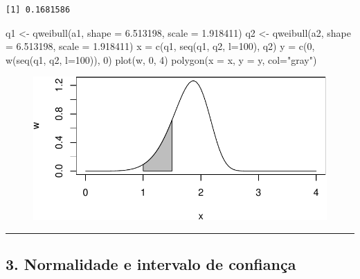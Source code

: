 \documentclass[
  letterpaper,
  DIV=11,
  numbers=noendperiod]{scrartcl}
\newenvironment{Shaded}{\begin{snugshade}}{\end{snugshade}}
\newcommand{\AttributeTok}[1]{\textcolor[rgb]{0.40,0.45,0.13}{#1}}
\newcommand{\DecValTok}[1]{\textcolor[rgb]{0.68,0.00,0.00}{#1}}
\newcommand{\FloatTok}[1]{\textcolor[rgb]{0.68,0.00,0.00}{#1}}
\newcommand{\FunctionTok}[1]{\textcolor[rgb]{0.28,0.35,0.67}{#1}}
\newcommand{\NormalTok}[1]{\textcolor[rgb]{0.00,0.23,0.31}{#1}}
\newcommand{\OtherTok}[1]{\textcolor[rgb]{0.00,0.23,0.31}{#1}}
\newcommand{\StringTok}[1]{\textcolor[rgb]{0.13,0.47,0.30}{#1}}
\begin{document}
\begin{verbatim}
[1] 0.1681586
\end{verbatim}

\begin{Shaded}
\begin{Highlighting}[]
\NormalTok{q1 }\OtherTok{\textless{}{-}} \FunctionTok{qweibull}\NormalTok{(a1, }\AttributeTok{shape =} \FloatTok{6.513198}\NormalTok{, }\AttributeTok{scale =} \FloatTok{1.918411}\NormalTok{)}
\NormalTok{q2 }\OtherTok{\textless{}{-}} \FunctionTok{qweibull}\NormalTok{(a2, }\AttributeTok{shape =} \FloatTok{6.513198}\NormalTok{, }\AttributeTok{scale =} \FloatTok{1.918411}\NormalTok{)}
\NormalTok{x }\OtherTok{=} \FunctionTok{c}\NormalTok{(q1, }\FunctionTok{seq}\NormalTok{(q1, q2, }\AttributeTok{l=}\DecValTok{100}\NormalTok{), q2)}
\NormalTok{y }\OtherTok{=} \FunctionTok{c}\NormalTok{(}\DecValTok{0}\NormalTok{, }\FunctionTok{w}\NormalTok{(}\FunctionTok{seq}\NormalTok{(q1, q2, }\AttributeTok{l=}\DecValTok{100}\NormalTok{)), }\DecValTok{0}\NormalTok{)}
\FunctionTok{plot}\NormalTok{(w, }\DecValTok{0}\NormalTok{, }\DecValTok{4}\NormalTok{)}
\FunctionTok{polygon}\NormalTok{(}\AttributeTok{x =}\NormalTok{ x, }\AttributeTok{y =}\NormalTok{ y, }\AttributeTok{col=}\StringTok{"gray"}\NormalTok{)}
\end{Highlighting}
\end{Shaded}

\begin{figure}[H]

{\centering \includegraphics{quiz5_files/figure-pdf/unnamed-chunk-22-1.pdf}

}

\end{figure}

\begin{center}\rule{0.5\linewidth}{0.5pt}\end{center}

\hypertarget{normalidade-e-intervalo-de-confianuxe7a}{%
\subsection{3. Normalidade e intervalo de
confiança}\label{normalidade-e-intervalo-de-confianuxe7a}}
\end{document}
